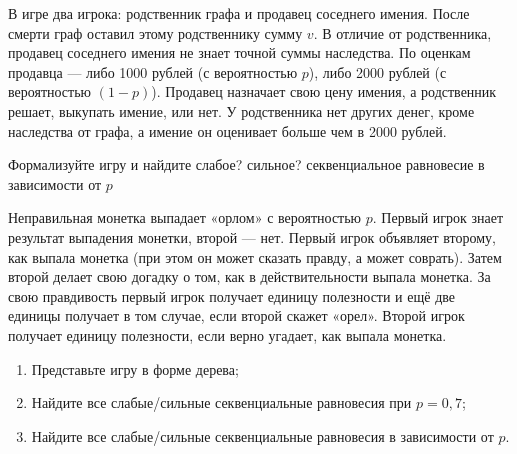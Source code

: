 \begin{problem}[Наследство]\par
\begin{source} \cite[3.3]{slanthcev:gt} \end{source}
В игре два игрока: родственник графа и продавец соседнего имения. После смерти граф оставил этому родственнику сумму  $v$. В отличие от родственника, продавец соседнего имения не знает точной суммы наследства. По оценкам продавца — либо 1000 рублей (с вероятностью  $p$), либо 2000 рублей (с вероятностью  $\left(1-p\right)$). Продавец назначает свою цену имения, а родственник решает, выкупать имение, или нет. У родственника нет других денег, кроме наследства от графа, а имение он оценивает больше чем в 2000 рублей. \par
 Формализуйте игру и найдите {\red слабое? сильное? секвенциальное} равновесие в зависимости от  $p$\par



\begin{sol}

\end{sol}
\end{problem}






\begin{problem} 
 Неправильная монетка выпадает «орлом» с вероятностью  $p$. Первый игрок знает результат выпадения монетки, второй — нет. Первый игрок объявляет второму, как выпала монетка (при этом он может сказать правду, а может соврать). Затем второй делает свою догадку о том, как в действительности выпала монетка. За свою правдивость первый игрок получает единицу полезности и ещё две единицы получает в том случае, если второй скажет «орел». Второй игрок получает единицу полезности, если верно угадает, как выпала монетка.\par
 \begin{enumerate}
\item Представьте игру в форме дерева;\par
\item Найдите все слабые/сильные секвенциальные равновесия при $p=0,7$;\par
\item Найдите все слабые/сильные секвенциальные равновесия в зависимости от $p$.
\end{enumerate}


\begin{sol}

\end{sol}
\end{problem}




